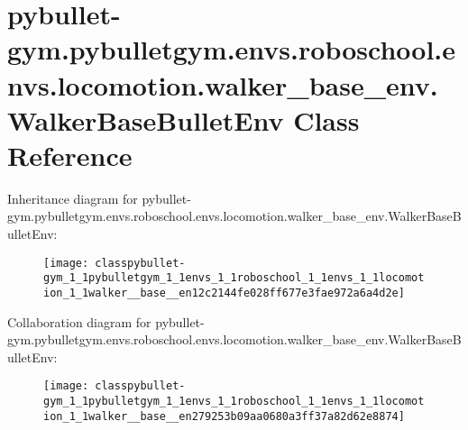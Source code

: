 \hypertarget{classpybullet-gym_1_1pybulletgym_1_1envs_1_1roboschool_1_1envs_1_1locomotion_1_1walker__base__env_1_1_walker_base_bullet_env}{}\section{pybullet-\/gym.pybulletgym.\+envs.\+roboschool.\+envs.\+locomotion.\+walker\+\_\+base\+\_\+env.\+Walker\+Base\+Bullet\+Env Class Reference}
\label{classpybullet-gym_1_1pybulletgym_1_1envs_1_1roboschool_1_1envs_1_1locomotion_1_1walker__base__env_1_1_walker_base_bullet_env}


Inheritance diagram for pybullet-\/gym.pybulletgym.\+envs.\+roboschool.\+envs.\+locomotion.\+walker\+\_\+base\+\_\+env.\+Walker\+Base\+Bullet\+Env\+:
\nopagebreak
\begin{figure}[H]
\begin{center}
\leavevmode
\texttt{[image: classpybullet-gym\_1\_1pybulletgym\_1\_1envs\_1\_1roboschool\_1\_1envs\_1\_1locomotion\_1\_1walker\_\_base\_\_en12c2144fe028ff677e3fae972a6a4d2e]}
\end{center}
\end{figure}


Collaboration diagram for pybullet-\/gym.pybulletgym.\+envs.\+roboschool.\+envs.\+locomotion.\+walker\+\_\+base\+\_\+env.\+Walker\+Base\+Bullet\+Env\+:
\nopagebreak
\begin{figure}[H]
\begin{center}
\leavevmode
\texttt{[image: classpybullet-gym\_1\_1pybulletgym\_1\_1envs\_1\_1roboschool\_1\_1envs\_1\_1locomotion\_1\_1walker\_\_base\_\_en279253b09aa0680a3ff37a82d62e8874]}
\end{center}
\end{figure}
